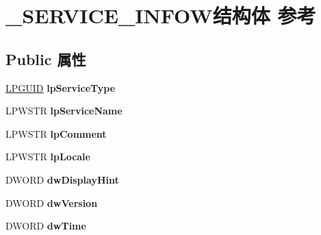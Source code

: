 \hypertarget{struct___s_e_r_v_i_c_e___i_n_f_o_w}{}\section{\+\_\+\+S\+E\+R\+V\+I\+C\+E\+\_\+\+I\+N\+F\+O\+W结构体 参考}
\label{struct___s_e_r_v_i_c_e___i_n_f_o_w}
\subsection*{Public 属性}
\begin{DoxyCompactItemize}
\item 
\mbox{\label{struct___s_e_r_v_i_c_e___i_n_f_o_w_a264399be0ad28653bd166141ab2627cc}} 
\hyperlink{interface_g_u_i_d}{L\+P\+G\+U\+ID} {\bfseries lp\+Service\+Type}
\item 
\mbox{\label{struct___s_e_r_v_i_c_e___i_n_f_o_w_a2979ca28685a6e6762176202fcce6b61}} 
L\+P\+W\+S\+TR {\bfseries lp\+Service\+Name}
\item 
\mbox{\label{struct___s_e_r_v_i_c_e___i_n_f_o_w_af29bdc501a7a4e8d39039ccba9a37463}} 
L\+P\+W\+S\+TR {\bfseries lp\+Comment}
\item 
\mbox{\label{struct___s_e_r_v_i_c_e___i_n_f_o_w_a086337ea6ee30086a6e6b4c5be99c2c1}} 
L\+P\+W\+S\+TR {\bfseries lp\+Locale}
\item 
\mbox{\label{struct___s_e_r_v_i_c_e___i_n_f_o_w_aef35306b6584e0bd43f3341445eb65d9}} 
D\+W\+O\+RD {\bfseries dw\+Display\+Hint}
\item 
\mbox{\label{struct___s_e_r_v_i_c_e___i_n_f_o_w_a9d9f8cc158be062538ae27987fa89b70}} 
D\+W\+O\+RD {\bfseries dw\+Version}
\item 
\mbox{\label{struct___s_e_r_v_i_c_e___i_n_f_o_w_aac1713b2567ee7cf214796fdf87e98c7}} 
D\+W\+O\+RD {\bfseries dw\+Time}
\item 
\mbox{\label{struct___s_e_r_v_i_c_e___i_n_f_o_w_ae8b9388879019b4e785a60758889c965}} 

\end{DoxyCompactItemize}
